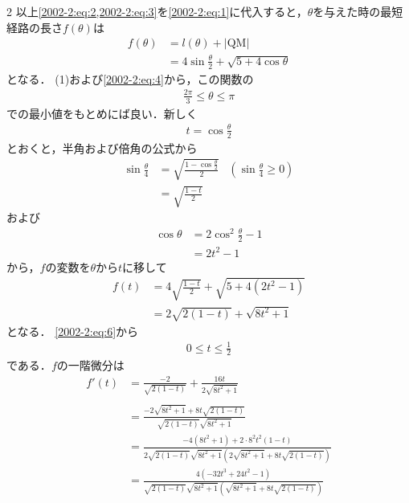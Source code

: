 \documentclass[../../main.tex]{subfiles}
\begin{document}
\begin{multicols}{2}
  以上\cref{2002-2:eq:2,2002-2:eq:3}を\cref{2002-2:eq:1}に代入すると，$\theta$を与えた時の最短経路の長さ$f(\theta)$は
  \begin{align}
    f(\theta)
     & = l(\theta) + |\text{QM}|                                          \\
     & = 4\sin\frac{\theta}{2} + \sqrt{5+4\cos\theta} \label{2002-2:eq:5}
  \end{align}
  となる．
  (1)および\cref{2002-2:eq:4}から，この関数の
  \begin{align}
    \frac{2\pi}{3} \le \theta \le \pi \label{2002-2:eq:6}
  \end{align}
  での最小値をもとめにば良い．新しく
  \begin{align*}
    t=\cos\frac{\theta}{2}
  \end{align*}
  とおくと，半角および倍角の公式から
  \begin{align*}
    \sin\frac{\theta}{4}
     & = \sqrt{\frac{1-\cos\frac{\theta}{2}}{2}} & \left(\sin\frac{\theta}{4}\ge 0\right) \\
     & = \sqrt{\frac{1-t}{2}}
  \end{align*}
  および
  \begin{align*}
    \cos\theta
     & = 2\cos^2\frac{\theta}{2} - 1 \\
     & = 2t^2-1
  \end{align*}
  から，$f$の変数を$\theta$から$t$に移して
  \begin{align}
    f(t)
     & = 4\sqrt{\frac{1-t}{2}} + \sqrt{5+4(2t^2-1)} \nonumber \\
     & = 2\sqrt{2(1-t)} + \sqrt{8t^2+1} \label{2002-2:eq:9}
  \end{align}
  となる．
  \cref{2002-2:eq:6}から
  \begin{align}
    0\le t \le \frac{1}{2} \label{2002-2:eq:7}
  \end{align}
  である．$f$の一階微分は
  \begin{align*}
    f'(t)
     & = \frac{-2}{\sqrt{2(1-t)}} + \frac{16t}{2\sqrt{8t^2+1}}                                                            \\                                      \\
     & = \frac{-2\sqrt{8t^2+1} + 8t\sqrt{2(1-t)}}{\sqrt{2(1-t)}\sqrt{8t^2+1}}                                             \\
     & = \frac{-4(8t^2+1) + 2\cdot 8^2t^2(1-t)}{2\sqrt{2(1-t)}\sqrt{8t^2+1}\left(2\sqrt{8t^2+1} + 8t\sqrt{2(1-t)}\right)} \\
     & = \frac{4(-32t^3 + 24t^2-1)}{\sqrt{2(1-t)}\sqrt{8t^2+1}\left(\sqrt{8t^2+1} + 8t\sqrt{2(1-t)}\right)}

\end{align*}
\end{multicols}
\end{document}
